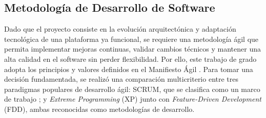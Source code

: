 \subsection{Metodología de Desarrollo de Software}

Dado que el proyecto consiste en la evolución arquitectónica y adaptación tecnológica de una plataforma ya funcional, se requiere una metodología ágil que permita implementar mejoras continuas, validar cambios técnicos y mantener una alta calidad en el software sin perder flexibilidad. Por ello, este trabajo de grado adopta los principios y valores definidos en el Manifiesto Ágil \cite{AgileManifesto2001}. Para tomar una decisión fundamentada, se realizó una comparación multicriterio entre tres paradigmas populares de desarrollo ágil: SCRUM, que se clasifica como un marco de trabajo \cite{ScrumGuide2020}; y \textit{Extreme Programming} (XP) junto con \textit{Feature-Driven Development} (FDD), ambas reconocidas como metodologías de desarrollo.

\newcommand{\comparativaMetodologiasHeader}{
  \grayTableHeaderCell{3cm}{Criterio} &
  \grayTableHeaderCell{3cm}{SCRUM} &
  \grayTableHeaderCell{3cm}{XP} &
  \grayTableHeaderCell{3cm}{FDD} \\
}

\newcommand\metodologiasTableCaption{Comparativa entre las metodologías de desarrollo de software de interés. \hspace{1em}}


